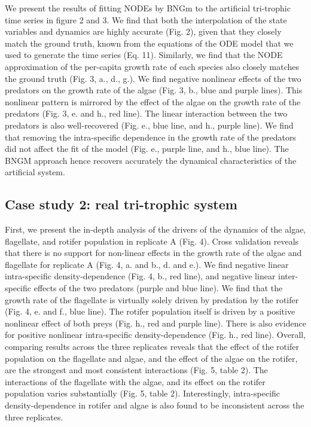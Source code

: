 \documentclass[11pt, oneside]{article}
\begin{document}
We present the results of fitting NODEs by BNGm to the artificial tri-trophic time series in figure 2 and 3.
We find that both the interpolation of the state variables and dynamics are highly accurate (Fig. 2), given that they closely match the ground truth, known from the equations of the ODE model that we used to generate the time series (Eq. 11).
Similarly, we find that the NODE approximation of the per-capita growth rate of each species also closely matches the ground truth (Fig. 3, a., d., g.). 
We find negative nonlinear effects of the two predators on the growth rate of the algae (Fig. 3, b., blue and purple lines).
This nonlinear pattern is mirrored by the effect of the algae on the growth rate of the predators (Fig. 3, e. and h., red line).
The linear interaction between the two predators is also well-recovered (Fig. e., blue line, and h., purple line).
We find that removing the intra-specific dependence in the growth rate of the predators did not affect the fit of the model (Fig. e., purple line, and h., blue line).
The BNGM approach hence recovers accurately the dynamical characteristics of the artificial system.

\subsection{Case study 2: real tri-trophic system}

First, we present the in-depth analysis of the drivers of the dynamics of the algae, flagellate, and rotifer population in replicate A (Fig. 4).
Cross validation reveals that there is no support for non-linear effects in the growth rate of the algae and flagellate for replicate A (Fig. 4, a. and b., d. and e.). 
We find negative linear intra-specific density-dependence (Fig. 4, b., red line), and negative linear inter-specific effects of the two predators (purple and blue line).
We find that the growth rate of the flagellate is virtually solely driven by predation by the rotifer (Fig. 4, e. and f., blue line).
The rotifer population itself is driven by a positive nonlinear effect of both preys (Fig. h., red and purple line).
There is also evidence for positive nonlinear intra-specific density-dependence (Fig. h., red line).
Overall, comparing results across the three replicates reveals that the effect of the rotifer population on the flagellate and algae, and the effect of the algae on the rotifer, are the strongest and most consistent interactions (Fig. 5, table 2).
The interactions of the flagellate with the algae, and its effect on the rotifer population varies substantially (Fig. 5, table 2). 
Interestingly, intra-specific density-dependence in rotifer and algae is also found to be inconsistent across the three replicates.
\end{document}
